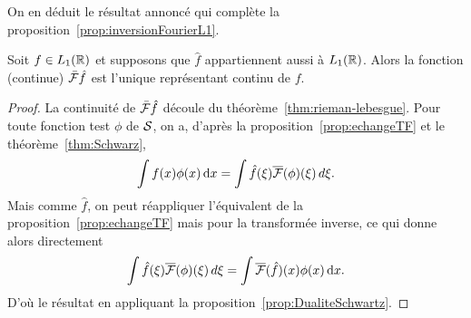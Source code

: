 On en d{\'e}duit le r{\'e}sultat annonc{\'e} qui compl{\`e}te la proposition~\ref{prop:inversionFourierL1}.
\begin{theorem}
\label{theo:inversion-L1}
Soit $f\in L_1(\mathbb{R})$ et supposons que $\hat{f}$ appartiennent aussi {\`a} $L_1(\mathbb{R})$. Alors
la fonction (continue) $\bar{\mathcal{F}} \hat{f}$ est l'unique
repr{\'e}sentant continu de $f$.
\end{theorem}
\begin{proof}
La continuit{\'e} de $\bar{\mathcal{F}} \hat{f}$ d{\'e}coule du th{\'e}or{\`e}me~\ref{thm:rieman-lebesgue}.
Pour toute fonction test $\phi$ de $\mathcal{S}$, on a, d'apr{\`e}s la proposition~\ref{prop:echangeTF} et le
th{\'e}or{\`e}me~\ref{thm:Schwarz},
$$
\int f(x) \phi(x)\,\mathrm{d} x=\int \hat{f}(\xi) \overline{\mathcal{F}}(\phi)(\xi)\,d\xi.
$$
Mais comme $\hat{f}$, on peut r{\'e}appliquer l'{\'e}quivalent de la proposition~\ref{prop:echangeTF} mais pour la transform{\'e}e
inverse, ce qui donne alors directement
$$
\int \hat{f}(\xi) \overline{\mathcal{F}}(\phi)(\xi)\,d\xi=\int \overline{\mathcal{F}}(\hat{f})(x) \phi(x) \,\mathrm{d} x.
$$
D'o{\`u} le r{\'e}sultat en appliquant la proposition~\ref{prop:DualiteSchwartz}.
\end{proof}

